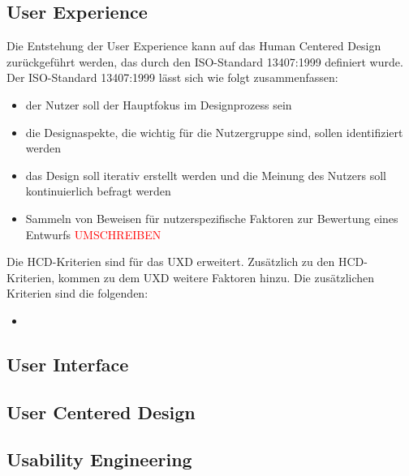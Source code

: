 \subsection{User Experience}

Die Entstehung der User Experience kann auf das Human Centered Design zurückgeführt werden, das durch den ISO-Standard 13407:1999 definiert wurde.
Der ISO-Standard 13407:1999 lässt sich wie folgt zusammenfassen:

\begin{itemize}
	\item der Nutzer soll der Hauptfokus im Designprozess sein
	\item die Designaspekte, die wichtig für die Nutzergruppe sind, sollen identifiziert werden
	\item das Design soll iterativ erstellt werden und die Meinung des Nutzers soll kontinuierlich befragt werden
	\item Sammeln von Beweisen für nutzerspezifische Faktoren zur Bewertung eines Entwurfs \textcolor{red}{UMSCHREIBEN}
\end{itemize}

Die HCD-Kriterien sind für das UXD erweitert.
Zusätzlich zu den HCD-Kriterien, kommen zu dem UXD weitere Faktoren hinzu.
Die zusätzlichen Kriterien sind die folgenden:

\begin{itemize}
	\item
\end{itemize}

\subsection{User Interface}

\subsection{User Centered Design}

\subsection{Usability Engineering}

